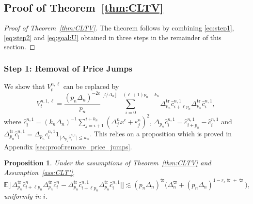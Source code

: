 \documentclass[ecta,nameyear,draft]{econsocart}
\newtheorem{prop}[theorem]{Proposition}
\def\wt{\widetilde}
\def\wh{\widehat}
\newcommand{\1}{\mathbf 1}
\def\E{\mathbb{E}}
\numberwithin{equation}{section}
\newcommand{\bone}{\mathbf 1}
\begin{document}
\begin{appendix}

\subsection{Proof of Theorem~\ref{thm:CLTV}}
\begin{proof}[Proof of Theorem~\ref{thm:CLTV}]
	The theorem follows by combining \eqref{eq:step1}, \eqref{eq:step2} and \eqref{eq:goal:U} obtained in three steps in the remainder of this section.
\end{proof}

\subsubsection*{Step 1: Removal of Price Jumps}

\noindent We show that $V^{n,\ell}_t$ can be replaced by
\begin{equation*}
	 V^{n,1,\ell}_t
	=
	\frac{(p_n\Delta_n)^{-2e}}{p_n}
	\sum_{i=0}^{\lfloor t/\Delta_n \rfloor - (\ell + 1) p_n-k_n}
\Delta_{p_n}^{\mathrm{tr}} \wh c^{n,1}_{i+\ell p_n}\Delta_{p_n}^{\mathrm{tr}} \wh c^{n,1}_i,
\end{equation*}
where $\wh c_{i}^{n,1}
=
(k_n \Delta_n)^{-1} \sum_{j=i+1}^{i+k_n} (\Delta^n_j x^c +   \varepsilon^n_{j})^2$, $ \Delta_{p_n} \wh c^{n,1}_i= \wh c^{n,1}_{i+p_n}- \wh c^{n,1}_i$ and $\Delta_{p_n}^{\mathrm{tr}} \wh c^{n,1}_i = \Delta_{p_n} \wh c^{n,1}_i \bone_{\lvert \Delta_{p_n} \wh c^{n,1}_i \rvert\leq w_n}$.  This relies on   a proposition which is proved in Appendix \ref{sec:proof:remove_price_jumps}.
\begin{prop}
	\label{prop:diff:nu_wtnu}
Under the assumptions of Theorem~\ref{thm:CLTV} and Assumption~\ref{ass:CLT'}, %
	\begin{equation}\label{eq:C1}
		\E \big[\big| \Delta_{p_n}^{\mathrm{tr}} \wh c^{n}_{i+\ell p_n}\Delta_{p_n}^{\mathrm{tr}} \wh c^{n}_i-\Delta_{p_n}^{\mathrm{tr}} \wh c^{n,1}_{i+\ell p_n}\Delta_{p_n}^{\mathrm{tr}} \wh c^{n,1}_i\big| \big]
		\lesssim 
		(p_n\Delta_n)^{\wt\varpi}
		\big(
		\Delta_n^{\varpi} + (p_n\Delta_n)^{1-r_s\wt\varpi +\wt\varpi}
		\big),
	\end{equation}
uniformly in $i$.
\end{prop}
%


\end{appendix}
\end{document}
